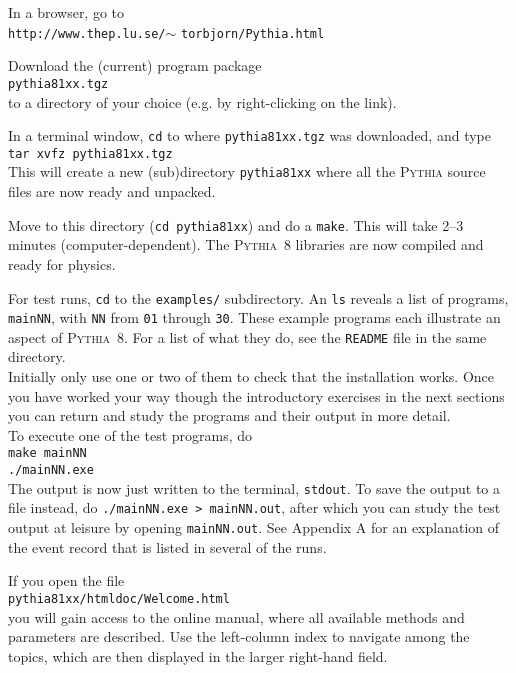 \documentclass[12pt,a4paper]{article}
\newcounter{enumct}
\newenvironment{Enumerate}{\begin{list}{\arabic{enumct}.}%
{\usecounter{enumct}\setlength{\topsep}{0.4mm}%
\setlength{\partopsep}{0.4mm}\setlength{\itemsep}{0.4mm}%
\setlength{\parsep}{0.4mm}}}{\end{list}}
\begin{document}
\begin{Enumerate}
\item In a browser, go to\\
\hspace*{10mm}\texttt{http://www.thep.lu.se/}$\sim$%
\texttt{torbjorn/Pythia.html}
\item Download the (current) program package\\
\hspace*{10mm}\texttt{pythia81xx.tgz}\\
to a directory of your choice (e.g. by right-clicking on the link).
\item In a terminal window, \texttt{cd} to where \texttt{pythia81xx.tgz} 
was downloaded, and type\\
\hspace*{10mm}\texttt{tar xvfz pythia81xx.tgz}\\
This will create a new (sub)directory \texttt{pythia81xx} where all
the \textsc{Pythia} source files are now ready and unpacked.
\item Move to this directory (\texttt{cd pythia81xx}) and do a
\texttt{make}. This will take 2--3 minutes
(computer-dependent). The \textsc{Pythia}~8 libraries are now
compiled and ready for physics. 
\item For test runs, \texttt{cd} to the \texttt{examples/} subdirectory. 
An \texttt{ls} reveals a list of programs, \texttt{mainNN}, with
\texttt{NN} from \texttt{01} through \texttt{30}. These example 
programs each illustrate an aspect of \textsc{Pythia}~8. For a list
of what they do, see the \texttt{README} file in the same directory.\\ 
Initially only use one or two of them to check that the installation
 works. Once you have worked your way though the introductory exercises 
in the next sections you can return and study the programs and their 
output in more detail.\\
To execute one of the test programs, do\\
\hspace*{10mm}\texttt{make mainNN}\\
\hspace*{10mm}\texttt{./mainNN.exe}\\
The output is now just written to the terminal, \texttt{stdout}. 
To save the output to a file instead, do 
\texttt{./mainNN.exe >  mainNN.out}, after which you can study the 
test output at leisure by opening \texttt{mainNN.out}. See Appendix A 
for an explanation of the event record that is listed in several of 
the runs.
\item If you open the file\\
\hspace*{10mm}\texttt{pythia81xx/htmldoc/Welcome.html}\\
you will gain access to the online manual, where all available methods 
and parameters are described. Use the left-column index to navigate among 
the topics, which are then displayed in the larger right-hand field. 
\end{Enumerate}
\end{document}
